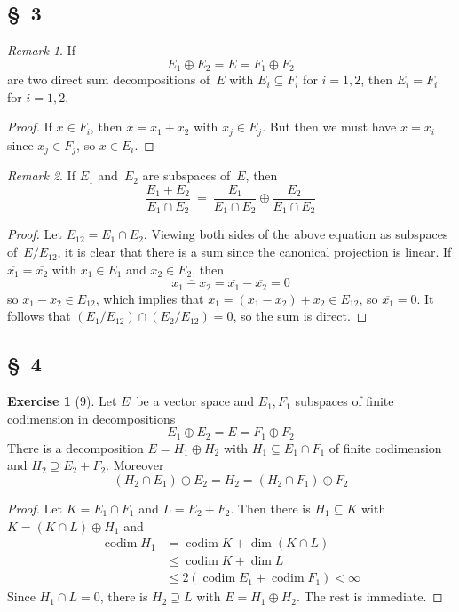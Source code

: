 \documentclass[letterpaper,12pt]{article}
\DeclareMathOperator{\codim}{codim}
\newcommand{\sect}{\cap}
\newcommand{\dsum}{\oplus}
\newcommand{\proj}[1]{\overline{#1}}
\theoremstyle{definition}
\newtheorem*{exer}{Exercise}
\theoremstyle{remark}
\newtheorem*{rmk}{Remark}
\begin{document}
\subsection*{\S~3}
\begin{rmk}
If
\[E_1\dsum E_2=E=F_1\dsum F_2\]
are two direct sum decompositions of~\(E\) with \(E_i\subseteq F_i\) for \(i=1,2\), then \(E_i=F_i\) for \(i=1,2\).
\end{rmk}
\begin{proof}
If \(x\in F_i\), then \(x=x_1+x_2\) with \(x_j\in E_j\). But then we must have \(x=x_i\) since \(x_j\in F_j\), so \(x\in E_i\).
\end{proof}

\begin{rmk}
If \(E_1\) and~\(E_2\) are subspaces of~\(E\), then
\[\frac{E_1+E_2}{E_1\sect E_2}\ =\ \frac{E_1}{E_1\sect E_2}\dsum\frac{E_2}{E_1\sect E_2}\]
\end{rmk}
\begin{proof}
Let \(E_{12}=E_1\sect E_2\). Viewing both sides of the above equation as subspaces of~\(E/E_{12}\), it is clear that there is a sum since the canonical projection is linear. If \(\proj{x_1}=\proj{x_2}\) with \(x_1\in E_1\) and \(x_2\in E_2\), then
\[\proj{x_1-x_2}=\proj{x_1}-\proj{x_2}=0\]
so \(x_1-x_2\in E_{12}\), which implies that \(x_1=(x_1-x_2)+x_2\in E_{12}\), so \(\proj{x_1}=0\). It follows that \((E_1/E_{12})\sect(E_2/E_{12})=0\), so the sum is direct.
\end{proof}

\subsection*{\S~4}
\begin{exer}[9]
Let \(E\)~be a vector space and \(E_1,F_1\) subspaces of finite codimension in decompositions
\[E_1\dsum E_2=E=F_1\dsum F_2\]
There is a decomposition \(E=H_1\dsum H_2\) with \(H_1\subseteq E_1\sect F_1\) of finite codimension and \(H_2\supseteq E_2+F_2\). Moreover
\[(H_2\sect E_1)\dsum E_2=H_2=(H_2\sect F_1)\dsum F_2\]
\end{exer}
\begin{proof}
Let \(K=E_1\sect F_1\) and \(L=E_2+F_2\). Then there is \(H_1\subseteq K\) with \(K=(K\sect L)\dsum H_1\) and
\begin{align*}
\codim H_1&=\codim K+\dim(K\sect L)\\
	&\le\codim K+\dim L\\
	&\le 2(\codim E_1+\codim F_1)<\infty
\end{align*}
Since \(H_1\sect L=0\), there is \(H_2\supseteq L\) with \(E=H_1\dsum H_2\). The rest is immediate.
\end{proof}
\end{document}
